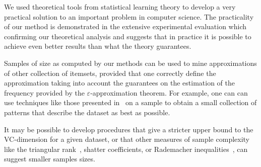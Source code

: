 We used theoretical tools from statistical learning theory to develop a very
practical solution to an important problem in computer science. The practicality
of our method is demonstrated in the extensive experimental evaluation which
confirming our theoretical analysis and suggests that in practice it is possible
to achieve even better results than what the theory guarantees. 

Samples of size as computed by our methods can be used to mine approximations
of other collection of itemsets, provided that one correctly define the
approximation taking into account the guarantees on the estimation of the
frequency provided by the $\varepsilon$-approximation theorem. For example, one
can can use techniques like those presented in~\citep{MampaeyTV11} on a sample
to obtain a small collection of patterns that describe the dataset as best as
possible.


It may be possible to develop procedures that give a stricter upper bound to the
VC-dimension for a given dataset, or that other measures of sample complexity
like the triangular rank~\citep{NewmanR12}, shatter coefficients, or Rademacher
inequalities~\citep{BoucheronBL05}, can suggest smaller samples sizes. 


